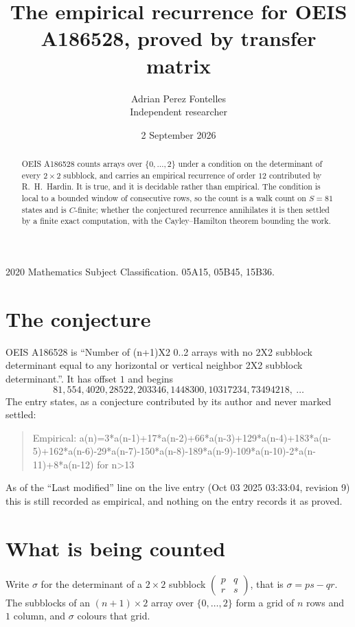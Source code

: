 \documentclass[11pt,a4paper]{article}
\title{The empirical recurrence for OEIS A186528, proved by transfer matrix}
\author{Adrian Perez Fontelles\\ \small Independent researcher}
\date{2 September 2026}
\theoremstyle{plain}
\theoremstyle{definition}
\begin{document}
\maketitle

\begin{abstract}
OEIS A186528 counts arrays over $\{0,\dots,2\}$ under a condition on the determinant of every
$2\times2$ subblock, and carries an empirical recurrence of order $12$ contributed by
R.~H.~Hardin. It is true, and it is decidable rather than empirical. The condition is local to
a bounded window of consecutive rows, so the count is a walk count on $S=81$ states and is
$C$-finite; whether the conjectured recurrence annihilates it is then settled by a finite exact
computation, with the Cayley--Hamilton theorem bounding the work.
\end{abstract}

\noindent\small 2020 Mathematics Subject Classification. 05A15, 05B45, 15B36.\normalsize

\section{The conjecture}

OEIS A186528 is ``Number of (n+1)X2 0..2 arrays with no 2X2 subblock determinant equal to any horizontal or vertical neighbor 2X2 subblock determinant.''. It has offset $1$ and begins
\[
81, 554, 4020, 28522, 203346, 1448300, 10317234, 73494218,\ \dots
\]
The entry states, as a conjecture contributed by its author and never marked settled:
\begin{quote}
Empirical: a(n)=3*a(n-1)+17*a(n-2)+66*a(n-3)+129*a(n-4)+183*a(n-5)+162*a(n-6)-29*a(n-7)-150*a(n-8)-189*a(n-9)-109*a(n-10)-2*a(n-11)+8*a(n-12) for n>13
\end{quote}
As of the ``Last modified'' line on the live entry (Oct 03 2025 03:33:04, revision 9) this is still
recorded as empirical, and nothing on the entry records it as proved.

\section{What is being counted}

Write $\sigma$ for the determinant of a $2\times2$ subblock
$\begin{pmatrix}p&q\\r&s\end{pmatrix}$, that is $\sigma=ps-qr$. The subblocks of an
$(n+1)\times2$ array over $\{0,\dots,2\}$ form a grid of $n$ rows and $1$
column, and $\sigma$ colours that grid.
\end{document}
